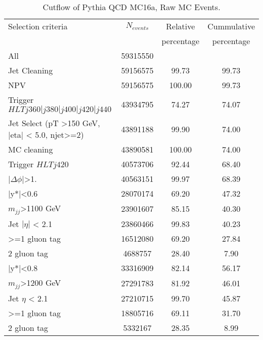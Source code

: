 \begin{table}[ht]
\begin{center}
\begin{tabular}{|l|c|c|c|}
\hline
Selection criteria & $N_{events}$ & Relative & Cummulative \\
   &             & percentage & percentage \\
\hline
All & 59315550 &  & \\
Jet Cleaning & 59156575 & 99.73 & 99.73 \\
NPV & 59156575 & 100.00 & 99.73 \\
Trigger $HLT j360|j380|j400|j420|j440$ & 43934795 & 74.27 & 74.07 \\
Jet Select (pT >150 GeV, |eta| < 5.0, njet>=2) & 43891188 & 99.90 & 74.00 \\
MC cleaning & 43890581 & 100.00 & 74.00 \\
\hline
Trigger $HLT j420$ & 40573706 & 92.44 & 68.40 \\
$|\Delta\phi|$>1. & 40563151 & 99.97 & 68.39 \\
\hline\hline
|y*|<0.6 & 28070174 & 69.20 & 47.32 \\
$m_{jj}$>1100 GeV & 23901607 & 85.15 & 40.30 \\
Jet $|\eta|$ < 2.1 & 23860466 & 99.83 & 40.23 \\
>=1 gluon tag & 16512080 & 69.20 & 27.84 \\
2 gluon tag & 4688757 & 28.40 & 7.90 \\
\hline\hline
|y*|<0.8 & 33316909 & 82.14 & 56.17 \\
$m_{jj}$>1200 GeV & 27291783 & 81.92 & 46.01 \\
Jet $\eta$ < 2.1 & 27210715 & 99.70 & 45.87 \\
>=1 gluon tag & 18805716 & 69.11 & 31.70 \\
2 gluon tag & 5332167 & 28.35 & 8.99 \\
\hline
\end{tabular}
\end{center}
\caption{Cutflow of Pythia QCD MC16a, Raw MC Events.}
\label{tab:bckgdcutflowMC16aRaw}
\end{table}%

